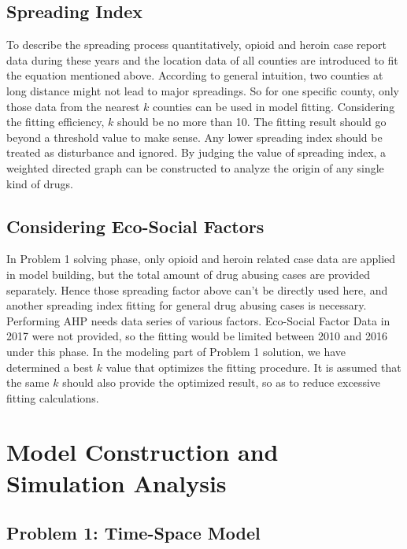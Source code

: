 \documentclass{mcmthesis}
\begin{document}
\subsection{Spreading Index}
To describe the spreading process quantitatively, opioid and heroin case report data during these years and the location data of all counties are introduced to fit the equation mentioned above. According to general intuition, two counties at long distance might not lead to major spreadings. So for one specific county, only those data from the nearest $k$ counties can be used in model fitting. Considering the fitting efficiency, $k$ should be no more than 10. The fitting result should go beyond a threshold value to make sense. Any lower spreading index should be treated as disturbance and ignored. By judging the value of spreading index, a weighted directed graph can be constructed to analyze the origin of any single kind of drugs.

\subsection{Considering Eco-Social Factors}
In Problem 1 solving phase, only opioid and heroin related case data are applied in model building, but the total amount of drug abusing cases are provided separately. Hence those spreading factor above can’t be directly used here, and another spreading index fitting for general drug abusing cases is necessary.
Performing AHP needs data series of various factors. Eco-Social Factor Data in 2017 were not provided, so the fitting would be limited between 2010 and 2016 under this phase.
In the modeling part of Problem 1 solution, we have determined a best $k$ value that optimizes the fitting procedure. It is assumed that the same $k$ should also provide the optimized result, so as to reduce excessive fitting calculations.


\section{Model Construction and Simulation Analysis}
\subsection{Problem 1: Time-Space Model}
\end{document}
